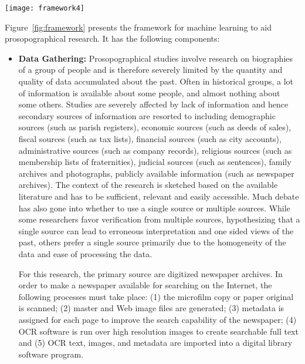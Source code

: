 \begin{figure*}
\centering
\texttt{[image: framework4]}
\caption{Research Framework showing components of proposed solution}
\label{fig:framework}
\end{figure*} 

Figure~\ref{fig:framework} presents the framework for machine learning to aid prosopographical research. It has the following components:

\begin{itemize}
\item \textbf{Data Gathering: } Prosopographical studies involve research on biographies of a group of people and is therefore severely limited by the quantity and quality of data accumulated about the past. Often in historical groups, a lot of information is available about some people, and almost nothing about some others. Studies are severely affected by lack of information and hence secondary sources of information are resorted to including demographic sources (such as parish registers), economic sources (such as deeds of sales), fiscal sources (such as tax lists), financial sources (such as city accounts), administrative sources (such as company records), religious sources (such as membership lists of fraternities), judicial sources (such as sentences), family archives and photographs, publicly available information (such as newspaper archives). The context of the research is sketched based on the available literature and has to be sufficient, relevant and easily accessible. Much debate has also gone into whether to use a single source or multiple sources. While some researchers favor verification from multiple sources, hypothesizing that a single source can lead to erroneous interpretation and one sided views of the past, others prefer a single source primarily due to the homogeneity of the data and ease of processing the data. 

For this research, the primary source are digitized newspaper archives. In order to make a newspaper available for searching on the Internet,
the following processes \cite{dutta2011learning} must take place: (1) the microfilm copy or
paper original is scanned; (2) master and Web image files are
generated; (3) metadata is assigned for each page to improve the
search capability of the newspaper; (4) OCR software is run over high
resolution images to create searchable full text and (5) OCR text,
images, and metadata are imported into a digital library software
program. 


\end{itemize}
